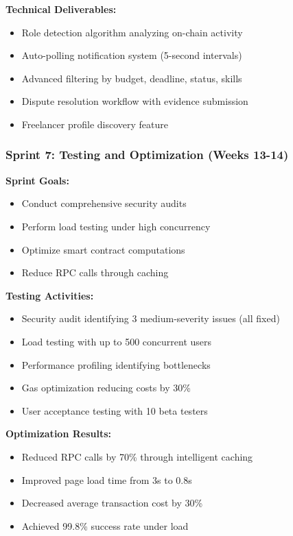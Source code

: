 \documentclass[a4paper,13pt,twoside]{report}
\theoremstyle{definition}
\begin{document}
\textbf{Technical Deliverables:}
\begin{itemize}
    \item Role detection algorithm analyzing on-chain activity
    \item Auto-polling notification system (5-second intervals)
    \item Advanced filtering by budget, deadline, status, skills
    \item Dispute resolution workflow with evidence submission
    \item Freelancer profile discovery feature
\end{itemize}

\subsubsection{Sprint 7: Testing and Optimization (Weeks 13-14)}

\textbf{Sprint Goals:}
\begin{itemize}
    \item Conduct comprehensive security audits
    \item Perform load testing under high concurrency
    \item Optimize smart contract computations
    \item Reduce RPC calls through caching
\end{itemize}

\textbf{Testing Activities:}
\begin{itemize}
    \item Security audit identifying 3 medium-severity issues (all fixed)
    \item Load testing with up to 500 concurrent users
    \item Performance profiling identifying bottlenecks
    \item Gas optimization reducing costs by 30\%
    \item User acceptance testing with 10 beta testers
\end{itemize}

\textbf{Optimization Results:}
\begin{itemize}
    \item Reduced RPC calls by 70\% through intelligent caching
    \item Improved page load time from 3s to 0.8s
    \item Decreased average transaction cost by 30\%
    \item Achieved 99.8\% success rate under load
\end{itemize}
\end{document}
